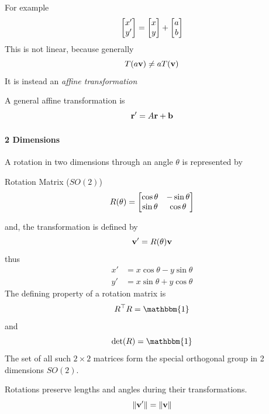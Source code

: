 			For example
			\begin{equation}
				\mqty[x'\\y'] = \mqty[x\\y] + \mqty[a\\b]
			\end{equation}
			This is not linear, because generally
			\begin{equation}
				T(a\vb{v}) \neq a T(\vb{v})
			\end{equation}
			It is instead an \textit{affine transformation}

			A general affine transformation is 
			\begin{equation}
				\vb{r}' = A\vb{r} + \vb{b}
			\end{equation}
			\paragraph{2 Dimensions}
				A rotation in two dimensions through an angle $\theta$ is represented by
				\begin{definition}{Rotation Matrix ($SO(2)$)}
					\begin{equation}
					R(\theta) = \mqty[
						\cos\theta & -\sin\theta\\
						\sin\theta & \cos\theta
					] 
					\end{equation}
				\end{definition}
				and, the transformation is defined by
				\begin{equation}
				    \vb{v}' = R(\theta) \vb{v}
				\end{equation}
				thus
				\begin{align}
					x' &= x\cos\theta - y\sin\theta\\
					y' &= x\sin\theta + y\cos\theta
				\end{align}
				The defining property of a rotation matrix is 
				\begin{equation}
					R^\top R = \mathbbm{1}
				\end{equation}
				and
				\begin{equation}
					\det(R) = \mathbbm{1}
				\end{equation}
				The set of all such $2\times2$ matrices form the special orthogonal group in 2 dimensions $SO(2)$.

				Rotations preserve lengths and angles during their transformations.
				\[
					\norm{\vb{v}'} = \norm{\vb{v}}
				\]
